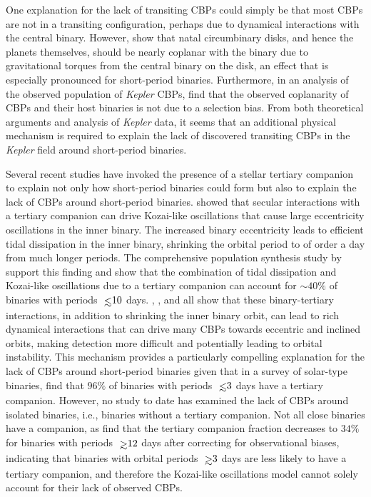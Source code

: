 One explanation for the lack of transiting CBPs could simply be that most CBPs are not in a transiting configuration, perhaps due to dynamical interactions with the central binary.  However, \citet{Foucart2013} show that natal circumbinary disks, and hence the planets themselves, should be nearly coplanar with the binary due to gravitational torques from the central binary on the disk, an effect that is especially pronounced for short-period binaries.  Furthermore, in an analysis of the observed population of {\it Kepler} CBPs, \citet{Li2016} find that the observed coplanarity of CBPs and their host binaries is not due to a selection bias.  From both theoretical arguments and analysis of {\it Kepler} data, it seems that an additional physical mechanism is required to explain the lack of discovered transiting CBPs in the {\it Kepler} field around short-period binaries.

Several recent studies have invoked the presence of a stellar tertiary companion to explain not only how short-period binaries could form but also to explain the lack of CBPs around short-period binaries. \citet{Fabrycky2007} showed that secular interactions with a tertiary companion can drive Kozai-like oscillations that cause large eccentricity oscillations in the inner binary.  The increased binary eccentricity leads to efficient tidal dissipation in the inner binary, shrinking the orbital period to of order a day from much longer periods. The comprehensive population synthesis study by \citet{Moe2018} support this finding and show that the combination of tidal dissipation and Kozai-like oscillations due to a tertiary companion can account for ${\sim}40\%$ of binaries with periods $\lsim 10$ days.  \citet{Munoz2015}, \citet{Martin2015b}, and \citet{Hamers2016} all show that these binary-tertiary interactions, in addition to shrinking the inner binary orbit, can lead to rich dynamical interactions that can drive many CBPs towards eccentric and inclined orbits, making detection more difficult and potentially leading to orbital instability. This mechanism provides a particularly compelling explanation for the lack of CBPs around short-period binaries given that in a survey of solar-type binaries, \citet{Tokovinin2006} find that $96\%$ of binaries with periods $\lsim 3$ days have a tertiary companion.  However, no study to date has examined the lack of CBPs around isolated binaries, i.e., binaries without a tertiary companion.  Not all close binaries have a companion, as \citet{Tokovinin2006} find that the tertiary companion fraction decreases to $34\%$ for binaries with periods $\gsim 12$ days after correcting for observational biases, indicating that binaries with orbital periods $\gsim 3$ days are less likely to have a tertiary companion, and therefore the Kozai-like oscillations model cannot solely account for their lack of observed CBPs.

